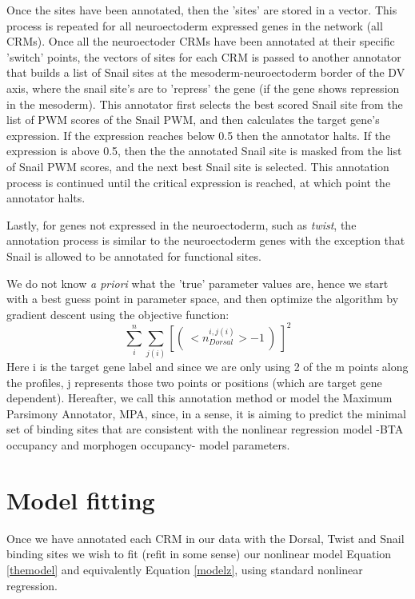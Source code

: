   Once the sites have been annotated, then the 'sites' are stored in a vector.  This process is repeated for all neuroectoderm expressed genes in the network (all CRMs).  Once all the neuroectoder CRMs have been annotated at their specific 'switch' points, the vectors of sites for each CRM is passed to another annotator that builds a list of Snail sites at the mesoderm-neuroectoderm border of the DV axis, where the snail site's are to 'repress' the gene (if the gene shows repression in the mesoderm).  This annotator first selects the best scored Snail site from the list of PWM scores of the Snail PWM, and then calculates the target gene's expression.  If the expression reaches below 0.5 then the annotator halts.  If the expression is above 0.5, then the the annotated Snail site is masked from the list of Snail PWM scores, and the next best Snail site is selected.  This annotation process is continued until the critical expression is reached, at which point the annotator halts.
  
  Lastly, for genes not expressed in the neuroectoderm, such as \textit{twist}, the annotation process is similar to the neuroectoderm genes with the exception that Snail is allowed to be annotated for functional sites. 
  
  We do not know \textit{a priori} what the 'true' parameter values are, hence we start with a best guess point in parameter space, and then optimize the algorithm by gradient descent using the objective function:
\begin{equation}\label{MPAobj}
   \sum_i^n \sum_{j(i)} [ ( \ <n_{Dorsal}^{i,j(i)}> - 1\ ) \ ]^2 
\end{equation}
Here i is the target gene label and since we are only using 2 of the m points along the profiles, j represents those two points or positions (which are target gene dependent).  Hereafter, we call this annotation method or model the Maximum Parsimony Annotator, MPA, since, in a sense, it is aiming to predict the minimal set of binding sites that are consistent with the nonlinear regression model -BTA occupancy and morphogen occupancy- model parameters.
 


\section{Model fitting}
Once we have annotated each CRM in our data with the Dorsal, Twist and Snail binding sites we wish to fit (refit in some sense) our nonlinear model Equation \ref{themodel} and equivalently Equation \ref{modelz}, using standard nonlinear regression.

